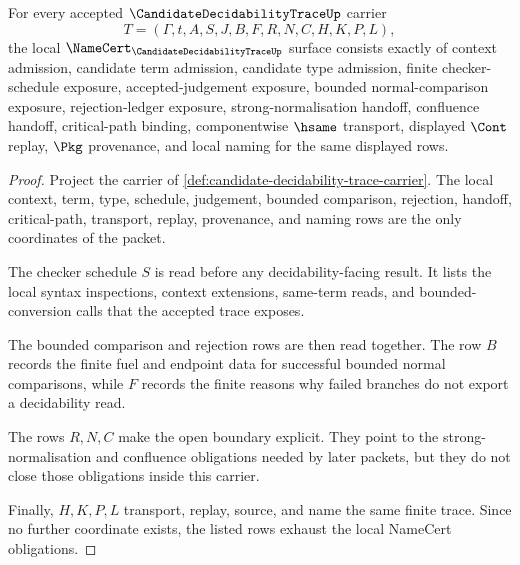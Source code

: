 \begin{theorem}
\label{thm:candidate-decidability-trace-namecert-obligations}
For every accepted $\CandidateDecidabilityTraceUp$ carrier
$$
T=(\Gamma,t,A,S,J,B,F,R,N,C,H,K,P,L),
$$
the local $\NameCert_{\CandidateDecidabilityTraceUp}$ surface consists exactly of context admission, candidate term admission, candidate type admission, finite checker-schedule exposure, accepted-judgement exposure, bounded normal-comparison exposure, rejection-ledger exposure, strong-normalisation handoff, confluence handoff, critical-path binding, componentwise $\hsame$ transport, displayed $\Cont$ replay, $\Pkg$ provenance, and local naming for the same displayed rows.
\end{theorem}
\begin{proof}
Project the carrier of \autoref{def:candidate-decidability-trace-carrier}. The local context, term, type, schedule, judgement, bounded comparison, rejection, handoff, critical-path, transport, replay, provenance, and naming rows are the only coordinates of the packet.

The checker schedule $S$ is read before any decidability-facing result. It lists the local syntax inspections, context extensions, same-term reads, and bounded-conversion calls that the accepted trace exposes.

The bounded comparison and rejection rows are then read together. The row $B$ records the finite fuel and endpoint data for successful bounded normal comparisons, while $F$ records the finite reasons why failed branches do not export a decidability read.

The rows $R,N,C$ make the open boundary explicit. They point to the strong-normalisation and confluence obligations needed by later packets, but they do not close those obligations inside this carrier.

Finally, $H,K,P,L$ transport, replay, source, and name the same finite trace. Since no further coordinate exists, the listed rows exhaust the local NameCert obligations.
\end{proof}

